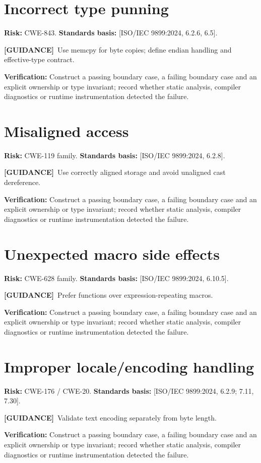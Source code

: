 \documentclass[10pt,letterpaper,oneside]{report}
\newcommand{\refcl}[1]{\textsf{\footnotesize[ISO/IEC 9899:2024, #1]}}
\newcommand{\guidance}{\textbf{[GUIDANCE]}}
\begin{document}
\section{Incorrect type punning}
\textbf{Risk:} CWE-843. \textbf{Standards basis:} \refcl{6.2.6, 6.5}.\par\guidance\ Use memcpy for byte copies; define endian handling and effective-type contract.\par\textbf{Verification:} Construct a passing boundary case, a failing boundary case and an explicit ownership or type invariant; record whether static analysis, compiler diagnostics or runtime instrumentation detected the failure.
\section{Misaligned access}
\textbf{Risk:} CWE-119 family. \textbf{Standards basis:} \refcl{6.2.8}.\par\guidance\ Use correctly aligned storage and avoid unaligned cast dereference.\par\textbf{Verification:} Construct a passing boundary case, a failing boundary case and an explicit ownership or type invariant; record whether static analysis, compiler diagnostics or runtime instrumentation detected the failure.
\section{Unexpected macro side effects}
\textbf{Risk:} CWE-628 family. \textbf{Standards basis:} \refcl{6.10.5}.\par\guidance\ Prefer functions over expression-repeating macros.\par\textbf{Verification:} Construct a passing boundary case, a failing boundary case and an explicit ownership or type invariant; record whether static analysis, compiler diagnostics or runtime instrumentation detected the failure.
\section{Improper locale/encoding handling}
\textbf{Risk:} CWE-176 / CWE-20. \textbf{Standards basis:} \refcl{6.2.9; 7.11, 7.30}.\par\guidance\ Validate text encoding separately from byte length.\par\textbf{Verification:} Construct a passing boundary case, a failing boundary case and an explicit ownership or type invariant; record whether static analysis, compiler diagnostics or runtime instrumentation detected the failure.
\end{document}
